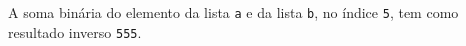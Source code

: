 \documentclass[12pt,varwidth=16cm,border=1pt]{standalone}
\begin{document}
A soma binária do elemento da lista \verb+a+ e da lista \verb+b+, no índice \verb+5+, tem como resultado inverso \verb+555+.

\questiomfalse
\end{document}
